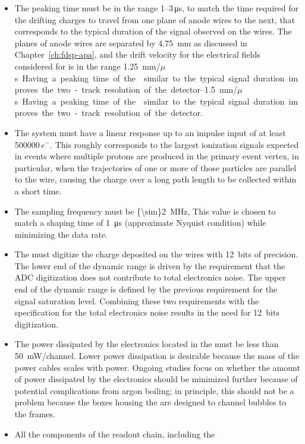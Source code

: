 \begin{itemize}
\item{The  peaking time must be in the range \numrange{1}{3}\,\si{\micro\second},
to match the time required for the drifting charges to travel from one plane of anode
wires to the next, that corresponds to the typical duration of the signal observed
on the wires. The planes of anode wires are separated by \SI{4.75}{mm}
as discussed in Chapter~\ref{ch:fdsp-apa}, and the drift velocity for
the electrical fields considered for  is in the range
\SIrange{1.25}{1.5}{mm/$\mu$s}. Having a peaking time of the 
similar to the typical signal duration improves the two-track resolution of
the detector.}
\item{The system must have a linear response up to an impulse input of 
at least \num{500000}\,$e^{-}$.  This roughly corresponds to the largest 
ionization signals expected in events where multiple protons are produced 
in the primary event vertex, in particular, when the trajectories of one 
or more of those particles are parallel to the wire, causing the charge 
over a long path length to be collected within a short time.}
\item{The  sampling frequency must be \SI{{\sim}2}{MHz},
This value is chosen to match a  shaping time of \SI{1}{\micro\second} 
(approximate Nyquist condition) while minimizing the data rate.}
\item{The  must digitize the charge deposited on the wires 
with 12~bits of precision.  The lower end of the  dynamic 
range is driven by the requirement that the ADC digitization does not 
contribute to total electronics noise. The upper end of the  
dynamic range is defined by the previous requirement for the signal 
saturation level. Combining these two requirements with the specification 
for the total electronics noise results in the need for 12~bits digitization.}
\item{The power dissipated by the electronics located in the  must
be less than \SI{50}{mW/channel}.  Lower power dissipation is desirable 
because the mass of the power cables scales with  power. Ongoing studies 
focus on whether the amount of power dissipated by the electronics 
should be minimized further because of potential complications from 
argon boiling; in principle, this should not be a problem because the 
 boxes housing the  are designed to channel 
bubbles to the  frames.}
\item{All the components of the readout chain, including the 
}
\end{itemize}
